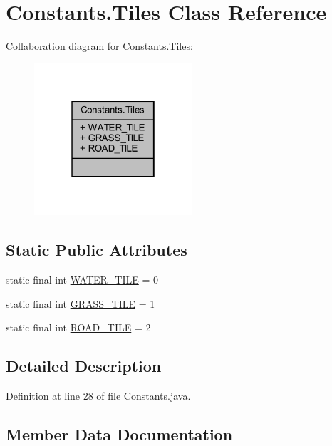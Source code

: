 \hypertarget{classhelpz_1_1_constants_1_1_tiles}{}\section{Constants.\+Tiles Class Reference}
\label{classhelpz_1_1_constants_1_1_tiles}


Collaboration diagram for Constants.\+Tiles\+:\nopagebreak
\begin{figure}[H]
\begin{center}
\leavevmode
\includegraphics[width=166pt]{classhelpz_1_1_constants_1_1_tiles__coll__graph}
\end{center}
\end{figure}
\subsection*{Static Public Attributes}
\begin{DoxyCompactItemize}
\item 
static final int \hyperlink{classhelpz_1_1_constants_1_1_tiles_a35d1252a92df8ca6a789c936b6d2e5ae}{W\+A\+T\+E\+R\+\_\+\+T\+I\+LE} = 0
\item 
static final int \hyperlink{classhelpz_1_1_constants_1_1_tiles_a43478a07ce3b44f9f86ad102d2baf5b2}{G\+R\+A\+S\+S\+\_\+\+T\+I\+LE} = 1
\item 
static final int \hyperlink{classhelpz_1_1_constants_1_1_tiles_ad9675ddcc562ae9292be2d4d25217eca}{R\+O\+A\+D\+\_\+\+T\+I\+LE} = 2
\end{DoxyCompactItemize}


\subsection{Detailed Description}


Definition at line 28 of file Constants.\+java.



\subsection{Member Data Documentation}
\mbox{\label{classhelpz_1_1_constants_1_1_tiles_a43478a07ce3b44f9f86ad102d2baf5b2}} 
